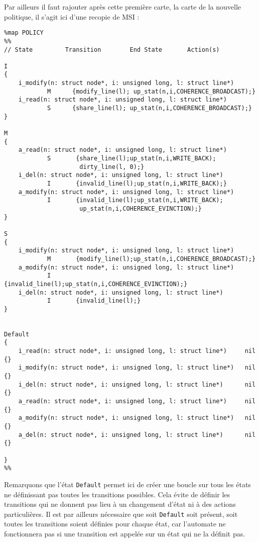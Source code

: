 Par ailleurs il faut rajouter après cette première carte, la carte de la nouvelle politique, il s'agit ici d'une recopie de MSI :
\begin{framed}
\begin{verbatim}
%map POLICY
%%
// State         Transition        End State       Action(s)

I
{
	i_modify(n: struct node*, i: unsigned long, l: struct line*)       
            M      {modify_line(l); up_stat(n,i,COHERENCE_BROADCAST);}
	i_read(n: struct node*, i: unsigned long, l: struct line*)         
            S      {share_line(l); up_stat(n,i,COHERENCE_BROADCAST);}           
}

M
{
	a_read(n: struct node*, i: unsigned long, l: struct line*)        
            S       {share_line(l);up_stat(n,i,WRITE_BACK);
                     dirty_line(l, 0);}
	i_del(n: struct node*, i: unsigned long, l: struct line*)         
            I       {invalid_line(l);up_stat(n,i,WRITE_BACK);}     
	a_modify(n: struct node*, i: unsigned long, l: struct line*)      
            I       {invalid_line(l);up_stat(n,i,WRITE_BACK);
                     up_stat(n,i,COHERENCE_EVINCTION);}
}

S
{
	i_modify(n: struct node*, i: unsigned long, l: struct line*)      
            M       {modify_line(l);up_stat(n,i,COHERENCE_BROADCAST);}
	a_modify(n: struct node*, i: unsigned long, l: struct line*)      
            I       {invalid_line(l);up_stat(n,i,COHERENCE_EVINCTION);}
	i_del(n: struct node*, i: unsigned long, l: struct line*)         
            I       {invalid_line(l);}                 
}


Default
{
	i_read(n: struct node*, i: unsigned long, l: struct line*)     nil    {}
	i_modify(n: struct node*, i: unsigned long, l: struct line*)   nil    {}
	i_del(n: struct node*, i: unsigned long, l: struct line*)      nil     {}
	a_read(n: struct node*, i: unsigned long, l: struct line*)     nil    {}
	a_modify(n: struct node*, i: unsigned long, l: struct line*)   nil    {}
	a_del(n: struct node*, i: unsigned long, l: struct line*)      nil     {}

}
%%
\end{verbatim}
\end{framed}

Remarquons que l'état \verb!Default! permet ici de créer une boucle sur tous les états ne définissant pas toutes les transitions possibles. Cela évite de définir les transitions qui ne donnent pas lieu à un changement d'état ni à des actions particulières. Il est par ailleurs nécessaire que soit \verb!Default! soit présent, soit toutes les transitions soient définies pour chaque état, car l'automate ne fonctionnera pas si une transition est appelée sur un état qui ne la définit pas.


